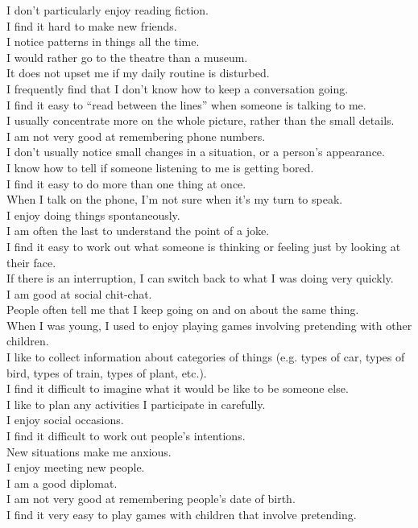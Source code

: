 \documentclass[a4paper, 11pt]{article}
\begin{document}
I don’t particularly enjoy reading fiction.\\
I find it hard to make new friends.\\
I notice patterns in things all the time.\\
I would rather go to the theatre than a museum.\\
It does not upset me if my daily routine is disturbed.\\
I frequently find that I don’t know how to keep a conversation going.\\
I find it easy to “read between the lines” when someone is talking to me.\\
I usually concentrate more on the whole picture, rather than the small details.\\
I am not very good at remembering phone numbers.\\
I don’t usually notice small changes in a situation, or a person’s appearance.\\
I know how to tell if someone listening to me is getting bored.\\
I find it easy to do more than one thing at once.\\
When I talk on the phone, I’m not sure when it’s my turn to speak.\\
I enjoy doing things spontaneously.\\
I am often the last to understand the point of a joke.\\
I find it easy to work out what someone is thinking or feeling just by looking at their face.\\
If there is an interruption, I can switch back to what I was doing very quickly. \\
I am good at social chit-chat.\\
People often tell me that I keep going on and on about the same thing.\\
When I was young, I used to enjoy playing games involving pretending with other children.\\
I like to collect information about categories of things (e.g. types of car, types of bird, types of train, types of plant, etc.).\\
I find it difficult to imagine what it would be like to be someone else.\\
I like to plan any activities I participate in carefully.\\
I enjoy social occasions.\\
I find it difficult to work out people’s intentions.\\
New situations make me anxious.\\
I enjoy meeting new people.\\
I am a good diplomat.\\
I am not very good at remembering people’s date of birth.\\
I find it very easy to play games with children that involve pretending.\\
\end{document}
